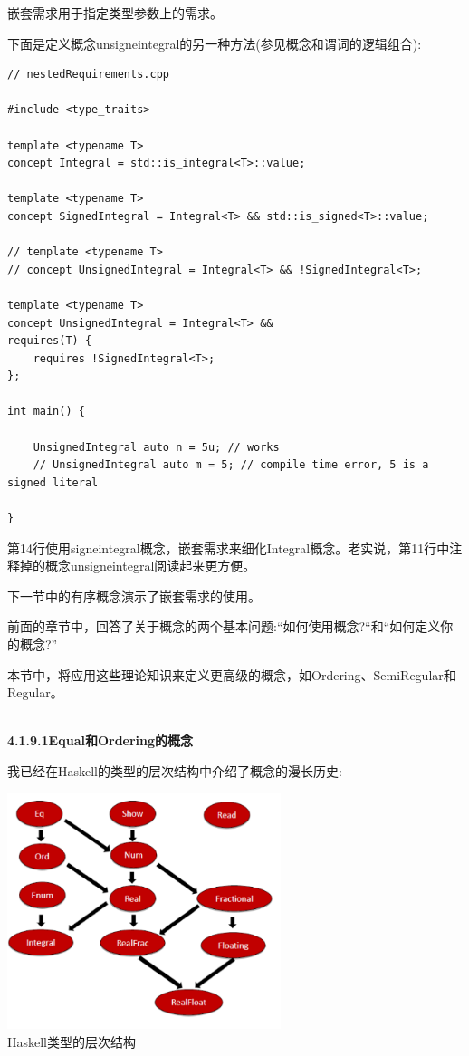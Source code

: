 嵌套需求用于指定类型参数上的需求。

下面是定义概念unsigneintegral的另一种方法(参见概念和谓词的逻辑组合):

\begin{lstlisting}[style=styleCXX]
// nestedRequirements.cpp

#include <type_traits>

template <typename T>
concept Integral = std::is_integral<T>::value;

template <typename T>
concept SignedIntegral = Integral<T> && std::is_signed<T>::value;

// template <typename T>
// concept UnsignedIntegral = Integral<T> && !SignedIntegral<T>;

template <typename T>
concept UnsignedIntegral = Integral<T> &&
requires(T) {
	requires !SignedIntegral<T>;
};

int main() {

	UnsignedIntegral auto n = 5u; // works
	// UnsignedIntegral auto m = 5; // compile time error, 5 is a signed literal

}
\end{lstlisting}

第14行使用signeintegral概念，嵌套需求来细化Integral概念。老实说，第11行中注释掉的概念unsigneintegral阅读起来更方便。

下一节中的有序概念演示了嵌套需求的使用。


前面的章节中，回答了关于概念的两个基本问题:“如何使用概念?“和“如何定义你的概念?”

本节中，将应用这些理论知识来定义更高级的概念，如Ordering、SemiRegular和Regular。

\hspace*{\fill} \\ %
\noindent
\textbf{4.1.9.1\hspace{0.2cm}Equal和Ordering的概念}

我已经在Haskell的类型的层次结构中介绍了概念的漫长历史:

\begin{center}
\includegraphics[width=0.6\textwidth]{content/3/chapter4/images/9.png}\\
Haskell类型的层次结构
\end{center}

